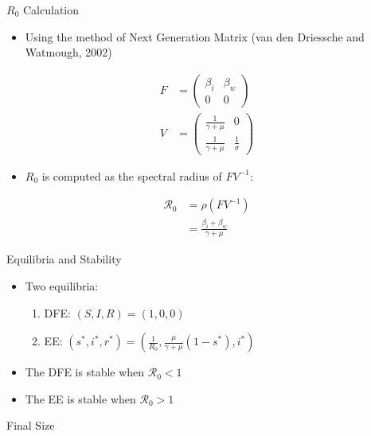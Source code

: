 \documentclass{beamer}\usepackage[]{graphicx}\usepackage[]{color}
\begin{document}
\begin{frame}[t]{$R_0$ Calculation}
\begin{itemize}
\item Using the method of Next Generation Matrix (van den Driessche and Watmough, 2002)
\end{itemize}
\begin{align*}
		F&=\begin{pmatrix}
			\beta_i & \beta_w\\
			0 & 0
			\end{pmatrix}\\
		V&=\begin{pmatrix}
			\frac{1}{\gamma+\mu} & 0\\
			\frac{1}{\gamma+\mu} &\frac{1}{\sigma}
			\end{pmatrix}
\end{align*}
\begin{itemize}
\item $R_0$ is computed as the spectral radius of $FV^{-1}$:
\end{itemize}
\begin{align*}
    {\mathcal R_0} &= \rho(FV^{-1})\\
		           &=\frac{\beta_i+\beta_w}{\gamma+\mu}
\end{align*}
\end{frame}

\begin{frame}{Equilibria and Stability}
\begin{itemize}
\setlength\itemsep{2em}
\item Two equilibria:\\[1em]
\begin{enumerate}
\setlength\itemsep{2em}
\item DFE: $(S,I,R)=(1,0,0)$
\item EE: $(s^{*},i^{*},r^{*}) = (\frac{1}{R_0}, \frac{\mu}{\gamma+\mu}(1-s^{*}), i^{*})$
\end{enumerate}
\item The DFE is stable when ${\mathcal R_0}<1$
\item The EE is stable when ${\mathcal R_0}>1$
\end{itemize}
\end{frame}

\begin{frame}{Final Size}

\end{frame}
\end{document}

